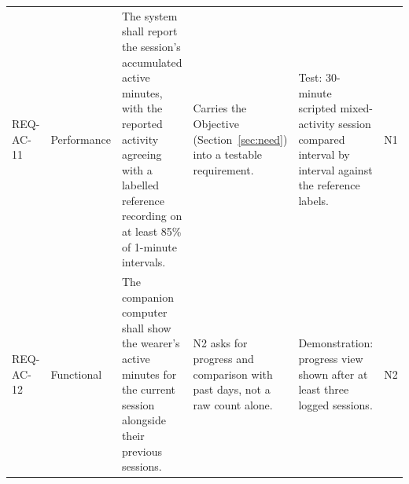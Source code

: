 \begin{table}[t]
\begin{tabular}{p{1.5cm}p{1.5cm}p{3.9cm}p{3.8cm}p{4.2cm}p{0.7cm}}
REQ-AC-11 & Performance &
The system shall report the session's accumulated active minutes,
with the reported activity agreeing with a labelled reference
recording on at least 85\% of 1-minute intervals. &
Carries the Objective (Section~\ref{sec:need}) into a testable
requirement. &
Test: 30-minute scripted mixed-activity session compared
interval by interval against the reference labels. &
N1 \\[0.6em]

REQ-AC-12 & Functional &
The companion computer shall show the wearer's active minutes for
the current session alongside their previous sessions. &
N2 asks for progress and comparison with past days, not a raw
count alone. &
Demonstration: progress view shown after at least three logged
sessions. &
N2 \\

\bottomrule
\end{tabular}
\end{table}
